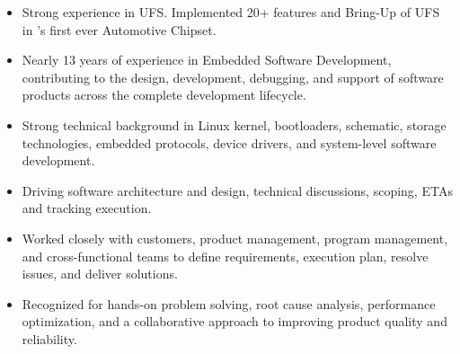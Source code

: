 \documentclass[10pt, a4paper]{article}
\begin{document}
\begin{itemize}[label={\textbullet}, leftmargin=*, topsep=0pt, partopsep=0pt, itemsep=0pt, parsep=0pt] %
   \item Strong experience in UFS. Implemented 20+ features and Bring-Up of UFS in \CompanyV{}'s first ever Automotive Chipset.
   \item Nearly 13 years of experience in Embedded Software Development, contributing to the design, development, debugging, and support of software products across the complete development lifecycle.
   \item Strong technical background in Linux kernel, bootloaders, schematic, storage technologies, embedded protocols, device drivers, and system-level software development.
   \item Driving software architecture and design, technical discussions, scoping, ETAs and tracking execution.
   \item Worked closely with customers, product management, program management, and cross-functional teams to define requirements, execution plan, resolve issues, and deliver solutions.
   \item Recognized for hands-on problem solving, root cause analysis, performance optimization, and a collaborative approach to improving product quality and reliability.
\end{itemize}
%
%
%
%
%
\vspace{1em}%
\end{document}
